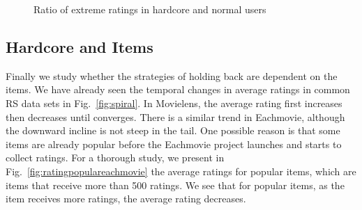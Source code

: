 \documentclass{sig-alternate}
\begin{document}
\begin{figure}[htbp]
\centering
\centering
{}
\caption{Ratio of extreme ratings in hardcore and normal users}
\label{fig:hardcore}
\end{figure}

\subsection{Hardcore and Items}
Finally we study whether the strategies of holding back are dependent on the items. We have already seen the temporal changes in average ratings in common RS data sets in Fig.~\ref{fig:spiral}. In Movielens, the average rating first increases then decreases until converges. There is a similar trend in Eachmovie, although the downward incline is not steep in the tail. One possible reason is that some items are already popular before the Eachmovie project launches and starts to collect ratings. For a thorough study, we present in Fig.~\ref{fig:ratingpopulareachmovie} the average ratings for popular items, which are items that receive more than 500 ratings. We see that for popular items, as the item receives more ratings, the average rating decreases.
\end{document}
